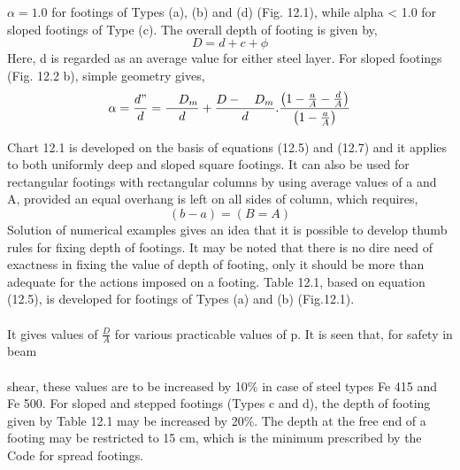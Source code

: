 \documentclass{book}
\begin{document}
$\alpha = 1.0$ for footings of Types (a), (b) and (d) (Fig. 12.1), while alpha < 1.0 for sloped footings of
Type (c). The overall depth of footing is given by,
\begin{equation}
D=d+c+\phi
\end{equation}
Here, d is regarded as an average value for either steel layer. For sloped footings (Fig. 12.2
b), simple geometry gives,
\begin{equation}
\alpha=\frac{d"}{d}=\frac{\quad{D_m}}{d}+\frac{D-\quad{D_m}}{d}.\frac{\left( 1-\frac{a}{A}-\frac{d}{A}\right)}{\left( 1-\frac{a}{A}\right)}
\end{equation}
\par Chart 12.1 is developed on the basis of equations (12.5) and (12.7) and it applies to both
uniformly deep and sloped square footings. It can also be used for rectangular footings with
rectangular columns by using average values of a and A, provided an equal overhang is left
on all sides of column, which requires,
\begin{equation}
(b-a)=(B=A)
\end{equation}
  Solution of numerical examples gives an idea that it is possible to develop thumb rules for fixing depth of footings. It may be noted that there is no dire need of exactness in fixing the value of depth of footing, only it should be more than adequate for the actions imposed on a footing. Table 12.1, based on equation (12.5), is developed for footings of Types (a) and (b) (Fig.12.1).\\\\
 It gives values of $\frac{D}{A}$ for various practicable values of p. It is seen that, for safety in beam\\ \\shear, these values are  to be increased by 10\% in case of steel types Fe 415 and Fe 500. For sloped and stepped footings (Types c and d), the depth of footing given by Table 12.1 may be increased by 20\%. The depth at the free end of a footing may be restricted to 15 cm, which is the minimum prescribed by the Code for spread footings.
\end{document}
